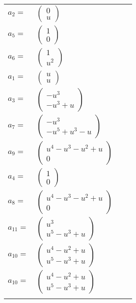 \documentclass[1p]{elsarticle_modified}
\theoremstyle{definition}
\begin{document}
\begin{tabular}{m{7pt} m{180pt} m{7pt} m{180pt} }
\flushright $a_{2}=$&$\begin{pmatrix}0\\u\end{pmatrix}$ \\
\flushright $a_{5}=$&$\begin{pmatrix}1\\0\end{pmatrix}$ \\
\flushright $a_{6}=$&$\begin{pmatrix}1\\u^2\end{pmatrix}$ \\
\flushright $a_{1}=$&$\begin{pmatrix}u\\u\end{pmatrix}$ \\
\flushright $a_{3}=$&$\begin{pmatrix}- u^3\\- u^3+u\end{pmatrix}$ \\
\flushright $a_{7}=$&$\begin{pmatrix}- u^3\\- u^5+u^3- u\end{pmatrix}$ \\
\flushright $a_{9}=$&$\begin{pmatrix}u^4- u^3- u^2+u\\0\end{pmatrix}$ \\
\flushright $a_{4}=$&$\begin{pmatrix}1\\0\end{pmatrix}$ \\
\flushright $a_{8}=$&$\begin{pmatrix}u^4- u^3- u^2+u\\0\end{pmatrix}$ \\
\flushright $a_{11}=$&$\begin{pmatrix}u^3\\u^5- u^3+u\end{pmatrix}$ \\
\flushright $a_{10}=$&$\begin{pmatrix}u^4- u^2+u\\u^5- u^3+u\end{pmatrix}$\\ \flushright $a_{10}=$&$\begin{pmatrix}u^4- u^2+u\\u^5- u^3+u\end{pmatrix}$\\&\end{tabular}
\end{document}
